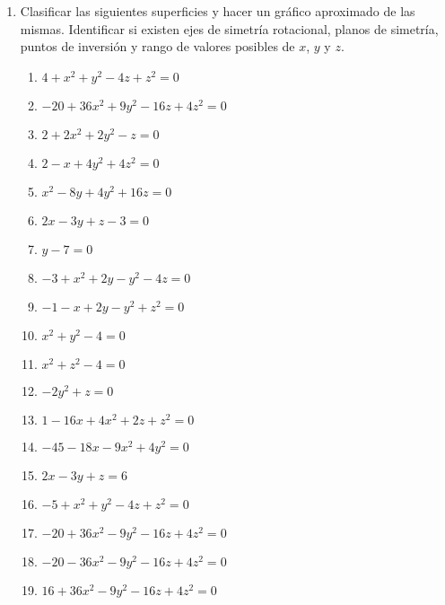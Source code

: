 \documentclass[a4paper]{article}
\newcommand{\answer}{\item[**]}
\newcommand{\exercise}{\item}
\begin{document}
\begin{enumerate}
\begin{multicols}{2}
\begin{enumerate} [label=(\alph*)]
		\item $3x^2+5y^2+5z^2+75=0$
		\answer Conjunto vacío $\emptyset$

		\item $36y^2-25z^2=0$
		\answer Dos planos: $6y-5z=0$ y $6y+5z=0$

		\item $3x^2+4y^2=0$
		\answer La recta $(x,y,z)=(0,0,0)+k(0,0,1)$. Recordar que $z$ es libre.

		\item $2z^2-8=0$
		\answer Dos planos: $z=2$ y $z=-2$

		\item $x^2=9$
		\answer Dos planos: $x=3$ y $x=-3$

	\end{enumerate}
	\end{multicols}

	\exercise Clasificar las siguientes superficies y hacer un gráfico aproximado de las mismas. Identificar si existen ejes de simetría rotacional, planos de simetría, puntos de inversión y rango de valores posibles de $x$, $y$ y $z$.
	\begin{multicols}{2}
	\begin{enumerate} [label=(\alph*)]
		
		\item $4+x^2+y^2-4z+z^2=0$
		\item $-20+36x^2+9y^2-16z+4z^2=0$
		\item $2+2x^2+2y^2-z=0$
		\item $2-x+4y^2+4z^2=0$
		\item $x^2-8y+4y^2+16z=0$
		\item $2x-3y+z-3=0$
		\item $y-7=0$
		\item $-3+x^2+2y-y^2-4z=0$
		\item $-1-x+2y-y^2+z^2=0$
		\item $x^2+y^2-4=0$
		\item $x^2+z^2-4=0$
		\item $-2y^2+z=0$
		\item $1-16x+4x^2+2z+z^2=0$
		\item $-45-18x-9x^2+4y^2=0$
		\item $2x-3y+z=6$
		\item $-5+x^2+y^2-4z+z^2=0$
		\item $-20+36x^2-9y^2-16z+4z^2=0$
		\item $-20-36x^2-9y^2-16z+4z^2=0$
		\item $16+36x^2-9y^2-16z+4z^2=0$


\end{enumerate}
\end{multicols}
\end{enumerate}
\end{document}
